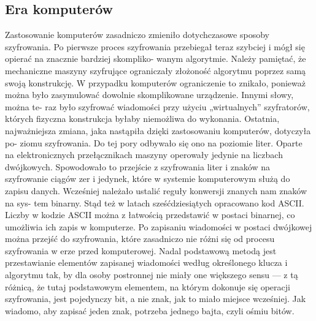 \documentclass[a4paper]{article}
\begin{document}
\subsection{Era komputerów}
Zastosowanie komputerów zasadniczo zmieniło dotychczasowe sposoby szyfrowania. Po pierwsze
proces szyfrowania przebiegał teraz szybciej i mógł się opierać na znacznie bardziej skompliko-
wanym algorytmie. Należy pamiętać, że mechaniczne maszyny szyfrujące ograniczały złożoność
algorytmu poprzez samą swoją konstrukcję. W przypadku komputerów ograniczenie to znikało,
ponieważ można było zasymulować dowolnie skomplikowane urządzenie. Innymi słowy, można te-
raz było szyfrować wiadomości przy użyciu „wirtualnych” szyfratorów, których fizyczna konstrukcja
byłaby niemożliwa do wykonania.
Ostatnia, najważniejsza zmiana, jaka nastąpiła dzięki zastosowaniu komputerów, dotyczyła po-
ziomu szyfrowania. Do tej pory odbywało się ono na poziomie liter. Oparte na elektronicznych
przełącznikach maszyny operowały jedynie na liczbach dwójkowych. Spowodowało to przejście z
szyfrowania liter i znaków na szyfrowanie ciągów zer i jedynek, które w systemie komputerowym
służą do zapisu danych. Wcześniej należało ustalić reguły konwersji znanych nam znaków na sys-
tem binarny. Stąd też w latach sześćdziesiątych opracowano kod ASCII.
Liczby w kodzie ASCII można z łatwością przedstawić w postaci binarnej, co umożliwia ich zapis
w komputerze. Po zapisaniu wiadomości w postaci dwójkowej można przejść do szyfrowania, które
zasadniczo nie różni się od procesu szyfrowania w erze przed komputerowej. Nadal podstawową
metodą jest przestawianie elementów zapisanej wiadomości według określonego klucza i algorytmu
tak, by dla osoby postronnej nie miały one większego sensu — z tą różnicą, że tutaj podstawowym
elementem, na którym dokonuje się operacji szyfrowania, jest pojedynczy bit, a nie znak, jak to
miało miejsce wcześniej. Jak wiadomo, aby zapisać jeden znak, potrzeba jednego bajta, czyli ośmiu
bitów.
\end{document}
